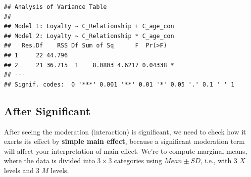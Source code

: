 \documentclass[
]{ctexart}
\begin{document}
\begin{verbatim}
## Analysis of Variance Table
## 
## Model 1: Loyalty ~ C_Relationship + C_age_con
## Model 2: Loyalty ~ C_Relationship * C_age_con
##   Res.Df    RSS Df Sum of Sq      F  Pr(>F)  
## 1     22 44.796                              
## 2     21 36.715  1    8.0803 4.6217 0.04338 *
## ---
## Signif. codes:  0 '***' 0.001 '**' 0.01 '*' 0.05 '.' 0.1 ' ' 1
\end{verbatim}

\hypertarget{after-significant}{%
\subsection{After Significant}\label{after-significant}}

After seeing the moderation (interaction) is significant, we need to
check how it exerts its effect by \textbf{simple main effect}, because a
significant moderation term will affect your interpretation of main
effect. We're to compute marginal means, where the data is divided into
\(3\times 3\) categories using \(Mean \pm SD\), i.e., with 3 \(X\)
levels and 3 \(M\) levels.
\end{document}
